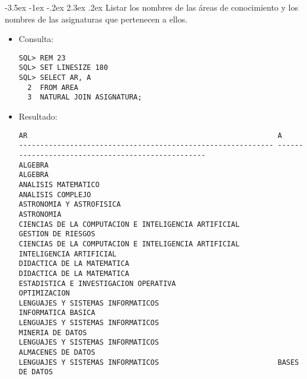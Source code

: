 \documentclass[11pt]{report}
\makeatletter
\renewcommand\chapter{\@startsection{chapter}{0}{\z@}%
    {-3.5ex \@plus -1ex \@minus -.2ex}%
    {2.3ex \@plus.2ex}%
    {\normalfont\Large\bfseries}}
\makeatother
\begin{document}
\chapter{Listar los nombres de las áreas de conocimiento y los nombres de las asignaturas que pertenecen a ellos.}
\begin{itemize}
  \item Consulta:
  \begin{verbatim}
SQL> REM 23
SQL> SET LINESIZE 180
SQL> SELECT AR, A
  2  FROM AREA
  3  NATURAL JOIN ASIGNATURA;
  \end{verbatim}
  \item{Resultado:}
  \begin{verbatim}
AR                                                           A                                                                                                                      
------------------------------------------------------------ --------------------------------------------------                                                                     
ALGEBRA                                                      ALGEBRA                                                                                                                
ANALISIS MATEMATICO                                          ANALISIS COMPLEJO                                                                                                      
ASTRONOMIA Y ASTROFISICA                                     ASTRONOMIA                                                                                                             
CIENCIAS DE LA COMPUTACION E INTELIGENCIA ARTIFICIAL         GESTION DE RIESGOS                                                                                                     
CIENCIAS DE LA COMPUTACION E INTELIGENCIA ARTIFICIAL         INTELIGENCIA ARTIFICIAL                                                                                                
DIDACTICA DE LA MATEMATICA                                   DIDACTICA DE LA MATEMATICA                                                                                             
ESTADISTICA E INVESTIGACION OPERATIVA                        OPTIMIZACION                                                                                                           
LENGUAJES Y SISTEMAS INFORMATICOS                            INFORMATICA BASICA                                                                                                     
LENGUAJES Y SISTEMAS INFORMATICOS                            MINERIA DE DATOS                                                                                                       
LENGUAJES Y SISTEMAS INFORMATICOS                            ALMACENES DE DATOS                                                                                                     
LENGUAJES Y SISTEMAS INFORMATICOS                            BASES DE DATOS                                                                                                         


\end{verbatim}
\end{itemize}
\end{document}
